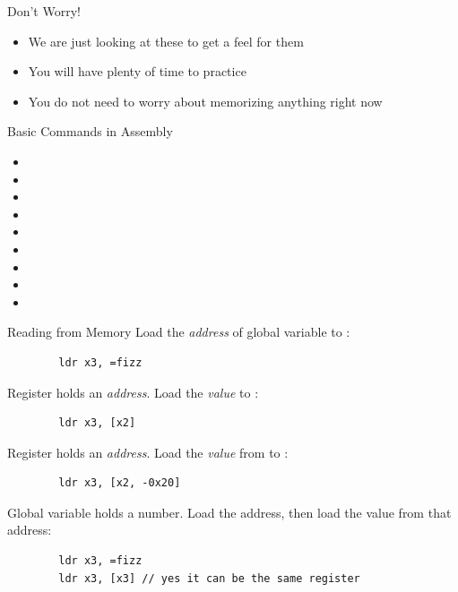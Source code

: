 \begin{frame}{Don't Worry!}
	\begin{itemize}
		\item We are just looking at these to get a feel for them
		\item You will have plenty of time to practice
		\item You do not need to worry about memorizing anything right now
	\end{itemize}
\end{frame}

\begin{frame}{Basic Commands in Assembly}
	\begin{itemize}
		\item {}
		\item {}
		\item {}
		\item {}
		\item {}
		\item {}
		\item {}
		\item {}
		\item {}
	\end{itemize}
\end{frame}


\begin{frame}[fragile]{Reading from Memory}
	Load the \emph{address} of global variable  to :
	\begin{verbatim}
		ldr x3, =fizz
	\end{verbatim}

	Register  holds an \emph{address}. Load the \emph{value} to :
	\begin{verbatim}
		ldr x3, [x2]
	\end{verbatim}

	Register  holds an \emph{address}. Load the \emph{value} from  to :
	\begin{verbatim}
		ldr x3, [x2, -0x20]
	\end{verbatim}

	Global variable  holds a number. Load the address, then load the value from that address:
	\begin{verbatim}
		ldr x3, =fizz
		ldr x3, [x3] // yes it can be the same register
	\end{verbatim}

\end{frame}


